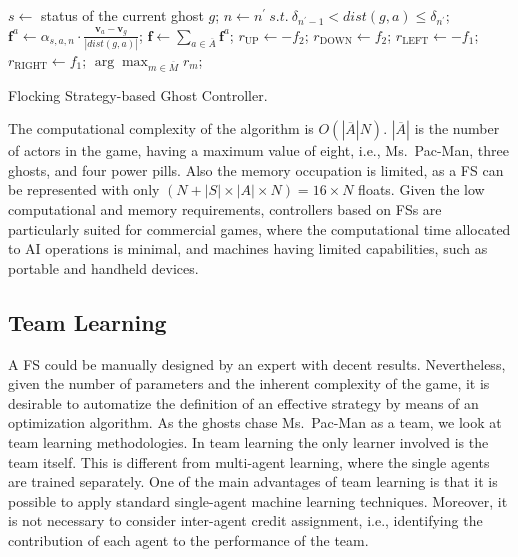 \documentclass[journal]{IEEEtran}
\begin{document}
\begin{algorithm}[!t]
\begin{algorithmic}
\STATE $s\gets$ status of the current ghost $g$;
	\STATE $n\gets n^\prime \ s.t.\ \delta_{n^\prime-1} < dist(g,a) \leq \delta_{n^\prime}$; 
	\STATE $\mathbf{f}^a \gets \alpha_{s,a,n} \cdot \frac{\mathbf{v}_a - \mathbf{v}_g}{|dist(g,a)|}$; 
\ENDFOR
\STATE $\mathbf{f} \gets \sum_{a \in \overline{A}} \mathbf{f}^a$; 
\STATE {}
\STATE $r_\text{UP} \gets - f_2$;
\STATE $r_\text{DOWN} \gets f_2$;
\STATE $r_\text{LEFT} \gets - f_1$;
\STATE $r_\text{RIGHT} \gets f_1$;
\RETURN $\arg\max_{m \in \overline{M}} r_m$; 
\end{algorithmic}
\caption{Flocking Strategy-based Ghost Controller.}
\label{alg:FS_Controller} 
\end{algorithm}

The computational complexity of the algorithm is $O(|\overline{A}|N)$. $|\overline{A}|$ is the number of actors in the game, having a maximum value of eight, i.e., Ms.\  Pac-Man, three ghosts, and four power pills. Also the memory occupation is limited, as a FS can be represented with only $(N + |S| \times |A| \times N) = 16 \times N$ floats. Given the low computational and memory requirements, controllers based on FSs are particularly suited for commercial games, where the computational time allocated to AI operations is minimal, and machines having limited capabilities, such as portable and handheld devices.

\subsection{Team Learning}
A FS could be manually designed by an expert with decent results. Nevertheless, given the number of parameters and the inherent complexity of the game, it is desirable to automatize the definition of an effective strategy by means of an optimization algorithm. As the ghosts chase Ms.\  Pac-Man as a team, we look at team learning methodologies. In team learning \cite{Panait2005} the only learner involved is the team itself. This is different from multi-agent learning, where the single agents are trained separately. One of the main advantages of team learning is that it is possible to apply standard single-agent machine learning techniques. Moreover, it is not necessary to consider inter-agent credit assignment, i.e., identifying the contribution of each agent to the performance of the team.
\end{document}
